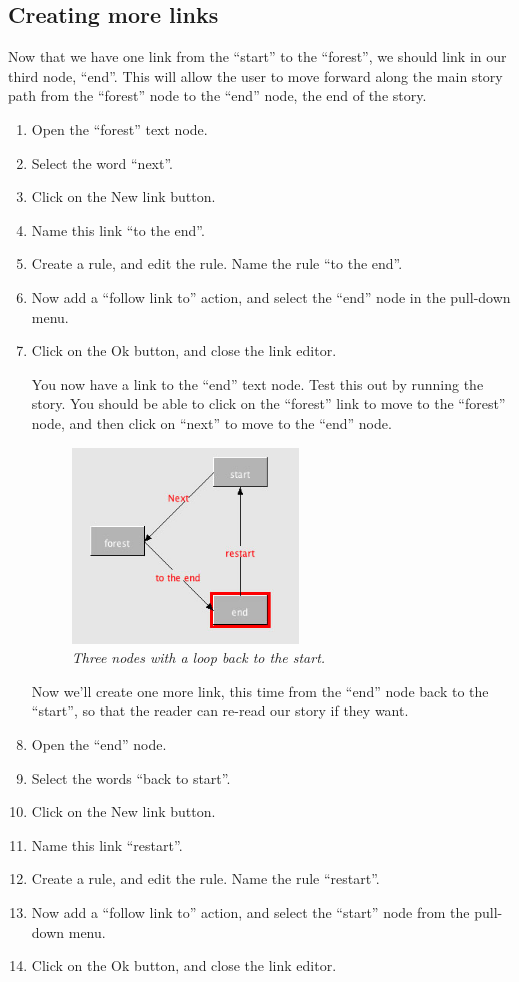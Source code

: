 \documentclass{article}
\begin{document}
\subsection{Creating more links}

Now that we have one link from the ``start'' to the ``forest'', we should link
in our third node, ``end''. This will allow the user to move forward along the
main story path from the ``forest'' node to the ``end'' node, the end of the story.

\begin{enumerate}
\item Open the ``forest'' text node.
\item Select the word ``next''.
\item Click on the New link button.
\item Name this link ``to the end''.
\item Create a rule, and edit the rule. Name the rule ``to the end''.
\item Now add a ``follow link to'' action, and select the ``end'' node in the
pull-down menu.
\item Click on the Ok button, and close the link editor.

You now have a link to the ``end'' text node. Test this out by running
the story. You should be able to click on the ``forest'' link to move to the
``forest'' node, and then click on ``next'' to move to the ``end'' node.
 
\begin{figure}[ht]
  \centering
  \includegraphics[width=6cm]{images/hypedyn-tutorial-1-figure-11}
  \caption{\textit{Three nodes with a loop back to the start.}}
  \label{fig:tut1:three_nodes_and_links}
\end{figure} 

Now we'll create one more link, this time from the ``end'' node back to the
``start'', so that the reader can re-read our story if they want.

\item Open the ``end'' node.
\item Select the words ``back to start''.
\item Click on the New link button.
\item Name this link ``restart''.
\item Create a rule, and edit the rule. Name the rule ``restart''.
\item Now add a ``follow link to'' action, and select the ``start'' node from
the pull-down menu.
\item Click on the Ok button, and close the link editor.
\end{enumerate}
\end{document}
